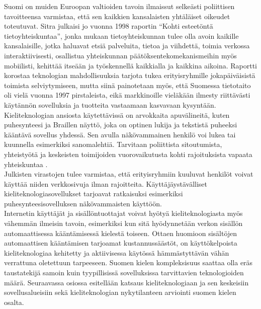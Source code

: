 \begin{multicols}{2}
Suomi on muiden Euroopan valtioiden tavoin ilmaissut selkeästi
poliittisen tavoitteensa varmistaa, että sen kaikkien kansalaisten yhtäläiset
oikeudet toteutuvat. Sitra julkaisi jo vuonna 1998 raportin “Kohti
esteetöntä tietoyhteiskuntaa”, jonka mukaan tietoyhteiskunnan
tulee olla avoin kaikille kansalaisille, jotka haluavat 
etsiä palveluita, tietoa ja viihdettä, toimia verkossa
interaktiivisesti, osallistua yhteiskunnan päätöksentekomekanismeihin
myös mobiilisti, kehittää itseään ja työskennellä kaikkialla ja
kaikkina aikoina. Raportti korostaa teknologian mahdollisuuksia
tarjota tukea erityisryhmille jokapäiväisistä toimista selviytymiseen,
mutta siinä painotetaan myös, että Suomessa tietotaito oli vielä
vuonna 1997 pirstaleista, eikä markkinoille vieläkään ilmesty riittävästi käytännön
sovelluksia ja tuotteita vastaamaan kasvavaan kysyntään. Kieliteknologian ansiosta
käytettävissä on arvokkaita apuvälineitä, kuten puhesynteesi ja Braillen
näyttö, joka on optinen lukija ja tekstistä puheeksi kääntävä sovellus yhdessä. 
Sen avulla näkövammainen henkilö voi lukea tai kuunnella esimerkiksi sanomalehtiä. 
Tarvitaan poliittista sitoutumista, yhteistyötä ja keskeisten toimijoiden 
vuorovaikutusta  kohti rajoituksista vapaata yhteiskuntaa \cite{Sitra1998}.\\
Julkisten virastojen tulee varmistaa, että erityisryhmiin kuuluvat
henkilöt voivat käyttää niiden verkkosivuja ilman
rajoitteita. Käyttäjäystävälliset kieliteknologiasovellukset tarjoavat
ratkaisuksi esimerkiksi puhesynteesisovelluksen näkövammaisten
käyttöön.\\
Internetin käyttäjät ja sisällöntuottajat voivat hyötyä
kieliteknologiasta myös vähemmän ilmeisin tavoin, esimerkiksi kun sitä
hyödynnetään verkon sisällön automaattisessa kääntämisessä kielestä
toiseen. Ottaen huomioon  sisältöjen automaattisen
kääntämisen tarjoamat kustannussäästöt, on käyttökelpoista kieliteknologiaa kehitetty 
ja aktiivisessa käytössä hämmästyttävän vähän 
verrattuna oletettuun tarpeeseen. Suomen kielen kompleksisuus saattaa olla 
eräs taustatekijä samoin kuin tyypillisissä sovelluksissa tarvittavien 
teknologioiden määrä. Seuraavassa osiossa esitellään katsaus kieliteknologiaan 
ja sen keskeisiin sovellusalueisiin sekä kieliteknologian
nykytilanteen arviointi suomen kielen osalta.



\end{multicols}
\clearpage
{}

